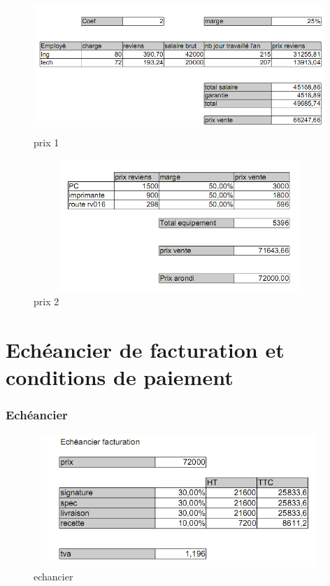 \documentclass{beamer}
\begin{document}
\begin{frame}

\begin{figure}[t]
\centering
\includegraphics[height=5cm,width=11cm]{images/prix1.PNG}
\caption{prix 1}
\label{prix 1}
\end{figure}
\end{frame}
\begin{frame}



\begin{figure}[t]
\centering
\includegraphics[height=5cm,width=11cm]{images/prix2.PNG}
\caption{prix 2}
\label{prix 2}
\end{figure}

\end{frame}

\section{Echéancier de facturation et conditions de paiement}
\begin{frame}\frametitle{Echéancier}

\begin{figure}[t]
\centering
\includegraphics[height=5cm,width=11cm]{images/echancier.PNG}
\caption{echancier}
\label{echancier}
\end{figure}


\end{frame}
\end{document}
